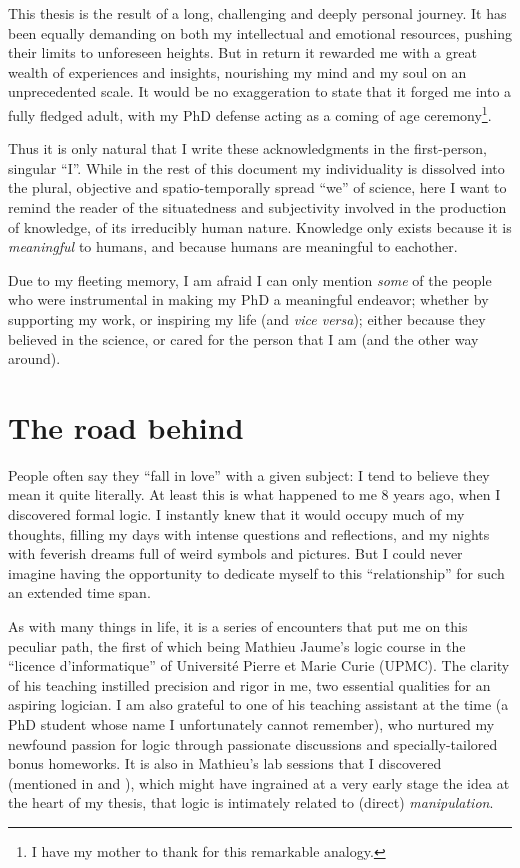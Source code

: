 
This thesis is the result of a long, challenging and deeply personal journey. It has been equally demanding on both my intellectual and emotional resources, pushing their limits to unforeseen heights. But in return it rewarded me with a great wealth of experiences and insights, nourishing my mind and my soul on an unprecedented scale. It would be no exaggeration to state that it forged me into a fully fledged adult, with my PhD defense acting as a coming of age ceremony\footnote{I have my mother to thank for this remarkable analogy.}.

Thus it is only natural that I write these acknowledgments in the first-person, singular ``I''. While in the rest of this document my individuality is dissolved into the plural, objective and spatio-temporally spread ``we'' of science, here I want to remind the reader of the situatedness and subjectivity involved in the production of knowledge, of its irreducibly human nature. Knowledge only exists because it is \emph{meaningful} to humans, and because humans are meaningful to eachother.

Due to my fleeting memory, I am afraid I can only mention \emph{some} of the people who were instrumental in making my PhD a meaningful endeavor; whether by supporting my work, or inspiring my life (and \textit{vice versa}); either because they believed in the science, or cared for the person that I am (and the other way around).

\section*{The road behind}

People often say they ``fall in love'' with a given subject: I tend to believe they mean it quite literally. At least this is what happened to me 8 years ago, when I discovered formal logic. I instantly knew that it would occupy much of my thoughts, filling my days with intense questions and reflections, and my nights with feverish dreams full of weird symbols and pictures. But I could never imagine having the opportunity to dedicate myself to this ``relationship'' for such an extended time span.

As with many things in life, it is a series of encounters that put me on this peculiar path, the first of which being Mathieu Jaume's logic course in the ``licence d'informatique'' of Université Pierre et Marie Curie (UPMC). The clarity of his teaching instilled precision and rigor in me, two essential qualities for an aspiring logician. I am also grateful to one of his teaching assistant at the time (a PhD student whose name I unfortunately cannot remember), who nurtured my newfound passion for logic through passionate discussions and specially-tailored bonus homeworks. It is also in Mathieu's lab sessions that I discovered  (mentioned in  and ), which might have ingrained at a very early stage the idea at the heart of my thesis, that logic is intimately related to (direct) \emph{manipulation}.

